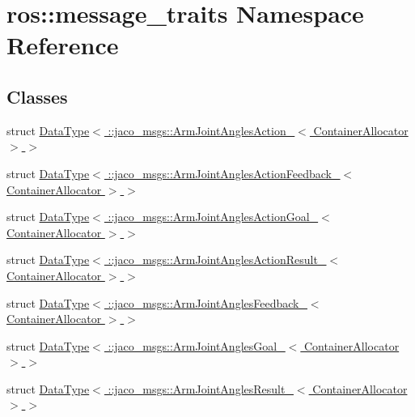 \hypertarget{namespaceros_1_1message__traits}{}\section{ros\+:\+:message\+\_\+traits Namespace Reference}
\label{namespaceros_1_1message__traits}
\subsection*{Classes}
\begin{DoxyCompactItemize}
\item 
struct \hyperlink{structros_1_1message__traits_1_1DataType_3_01_1_1jaco__msgs_1_1ArmJointAnglesAction___3_01ContainerAllocator_01_4_01_4}{Data\+Type$<$ \+::jaco\+\_\+msgs\+::\+Arm\+Joint\+Angles\+Action\+\_\+$<$ Container\+Allocator $>$ $>$}
\item 
struct \hyperlink{structros_1_1message__traits_1_1DataType_3_01_1_1jaco__msgs_1_1ArmJointAnglesActionFeedback___3_01ContainerAllocator_01_4_01_4}{Data\+Type$<$ \+::jaco\+\_\+msgs\+::\+Arm\+Joint\+Angles\+Action\+Feedback\+\_\+$<$ Container\+Allocator $>$ $>$}
\item 
struct \hyperlink{structros_1_1message__traits_1_1DataType_3_01_1_1jaco__msgs_1_1ArmJointAnglesActionGoal___3_01ContainerAllocator_01_4_01_4}{Data\+Type$<$ \+::jaco\+\_\+msgs\+::\+Arm\+Joint\+Angles\+Action\+Goal\+\_\+$<$ Container\+Allocator $>$ $>$}
\item 
struct \hyperlink{structros_1_1message__traits_1_1DataType_3_01_1_1jaco__msgs_1_1ArmJointAnglesActionResult___3_01ContainerAllocator_01_4_01_4}{Data\+Type$<$ \+::jaco\+\_\+msgs\+::\+Arm\+Joint\+Angles\+Action\+Result\+\_\+$<$ Container\+Allocator $>$ $>$}
\item 
struct \hyperlink{structros_1_1message__traits_1_1DataType_3_01_1_1jaco__msgs_1_1ArmJointAnglesFeedback___3_01ContainerAllocator_01_4_01_4}{Data\+Type$<$ \+::jaco\+\_\+msgs\+::\+Arm\+Joint\+Angles\+Feedback\+\_\+$<$ Container\+Allocator $>$ $>$}
\item 
struct \hyperlink{structros_1_1message__traits_1_1DataType_3_01_1_1jaco__msgs_1_1ArmJointAnglesGoal___3_01ContainerAllocator_01_4_01_4}{Data\+Type$<$ \+::jaco\+\_\+msgs\+::\+Arm\+Joint\+Angles\+Goal\+\_\+$<$ Container\+Allocator $>$ $>$}
\item 
struct \hyperlink{structros_1_1message__traits_1_1DataType_3_01_1_1jaco__msgs_1_1ArmJointAnglesResult___3_01ContainerAllocator_01_4_01_4}{Data\+Type$<$ \+::jaco\+\_\+msgs\+::\+Arm\+Joint\+Angles\+Result\+\_\+$<$ Container\+Allocator $>$ $>$}

\end{DoxyCompactItemize}
